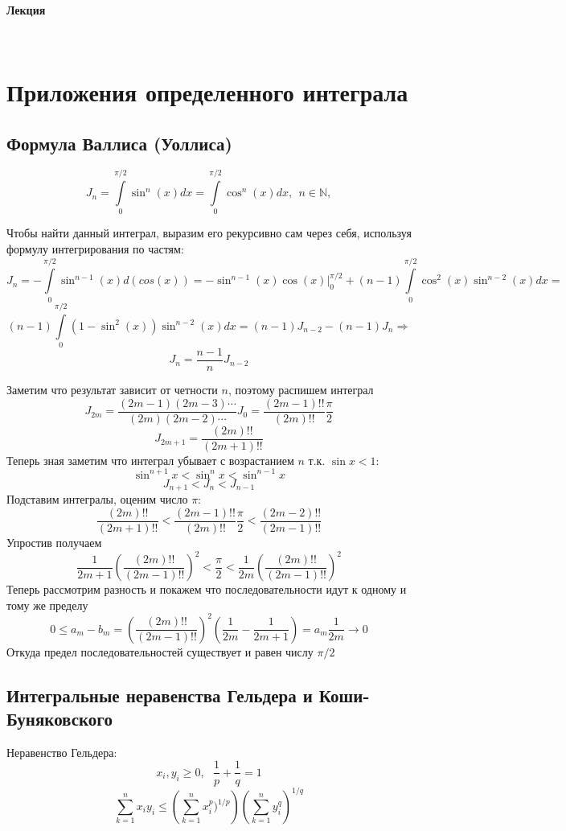 \documentclass[a4paper,11pt]{article}
\newcounter{lecture}
\newcommand{\lecture}{ \noindent
\noindent \LARGE \textbf{
Лекция \thelecture  
\stepcounter{lecture}} \large 

\

}
\newcommand{\N}{\mathbb{N}}
\newcommand{\Sum}{\sum\limits_{k = 1}^n}
\begin{document}
\setcounter{lecture}{4}
\

\lecture



\section{Приложения определенного интеграла}

\subsection{Формула Валлиса (Уоллиса)}

\[
J_n = \int\limits_0^{\pi/2} \sin^n(x)dx = \int\limits_0^{\pi/2} \cos^n(x)dx, \ \ n \in \N,
\]

Чтобы найти данный интеграл, выразим его рекурсивно сам через себя, используя формулу интегрирования по частям:
\[
J_n = - \int\limits_0^{\pi/2} \sin^{n-1}(x) d(cos(x)) = -\sin^{n-1} (x) \cos(x) \bigg|_0^{\pi/2} + (n-1)\int\limits_0^{\pi/2} \cos^2(x)\sin^{n-2}(x)dx =
\]
\[
 (n-1)\int\limits_0^{\pi/2} (1-\sin^2(x))\sin^{n-2}(x)dx = (n-1)J_{n-2} - (n-1)J_n \Rightarrow
\]
\[
J_n = \dfrac{n-1}{n} J_{n-2}
\]

Заметим что результат зависит от четности $n$, поэтому распишем интеграл
\[
J_{2m} = \dfrac{(2m - 1)(2m-3) \cdots}{(2m)(2m-2) \cdots} J_0  = \dfrac{(2m - 1)!!}{(2m)!!} \dfrac{\pi}{2}
\]
\[
J_{2m+1} = \dfrac{(2m)!!}{(2m+1)!!}
\]
Теперь зная заметим что интеграл убывает с возрастанием $n$ т.к. $\sin x < 1$:
\[
\sin^{n+1}x < \sin^nx < \sin^{n-1}x
\]
\[
J_{n+1} < J_n < J_{n-1}
\]
Подставим интегралы, оценим число $\pi$:
\[
\dfrac{(2m)!!}{(2m+1)!!} < \dfrac{(2m-1)!!}{(2m)!!} \dfrac{\pi}{2} < \dfrac{(2m-2)!!}{(2m-1)!!}
\]
Упростив получаем
\[
\dfrac{1}{2m+1} \left(\dfrac{(2m)!!}{(2m-1)!!}\right)^2 < \dfrac{\pi}{2} < \dfrac{1}{2m} \left(\dfrac{(2m)!!}{(2m-1)!!} \right)^2
\]
Теперь рассмотрим разность и покажем что последовательности идут к одному и тому же пределу
\[
0 \leq a_m - b_m = \left(\dfrac{(2m)!!}{(2m-1)!!} \right)^2 \left(\dfrac{1}{2m} - \dfrac{1}{2m+1} \right) = a_m \dfrac{1}{2m} \to 0
\]
Откуда предел последовательностей существует и равен числу $\pi/2$

\subsection{Интегральные неравенства Гельдера и Коши-Буняковского}

Неравенство Гельдера:
\[
x_i, y_i \geq 0, \ \ \ \dfrac{1}{p} + \dfrac{1}{q} = 1
\]
\[
\Sum x_i y_i \leq \left(\Sum x_i^p)^{1/p}\right)\left(\Sum y_i^q\right)^{1/q}
\]
\end{document}
